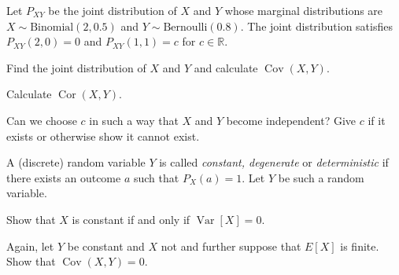 \documentclass[a4paper,10pt,landscape,twocolumn]{scrartcl}
\DeclareMathOperator{\Cov}{Cov}
\DeclareMathOperator{\Cor}{Cor}
\DeclareMathOperator{\Var}{Var}
\begin{document}
\begin{exercise}[3pt]
Let $P_{XY}$ be the joint distribution of $X$ and $Y$ whose marginal distributions are $X \sim \text{Binomial}(2, 0.5)$ and $Y \sim \text{Bernoulli}(0.8)$. The joint distribution satisfies $P_{XY}(2,0) = 0$ and $P_{XY}(1,1) = c$ for $c\in \mathbb R$.

	\begin{subex}[1pt]
	Find the joint distribution of $X$ and $Y$ and calculate $\Cov(X,Y)$.
	\end{subex}
	
	\begin{subex}[1pt]
	Calculate $\Cor(X,Y)$.	
	\end{subex}
	
	\begin{subex}[1pt]
	Can we choose $c$ in such a way that $X$ and $Y$ become independent?	 Give $c$ if it exists or otherwise show it cannot exist.
	\end{subex}
\end{exercise}


\begin{exercise}
A (discrete) random variable $Y$ is called \emph{constant, degenerate} or \emph{deterministic} if there exists an outcome $a$ such that $P_X(a) = 1$. Let $Y$ be such a random variable.

	\begin{subex}[1pt]
		Show that $X$ is constant if and only if $\Var[X] = 0$.	
	\end{subex}
	
	\begin{subex}[1pt]
		Again, let $Y$ be constant and $X$ not and further suppose that $E[X]$ is finite. Show that $\Cov(X,Y) = 0$.	
	\end{subex}
\end{exercise}


\end{document}
